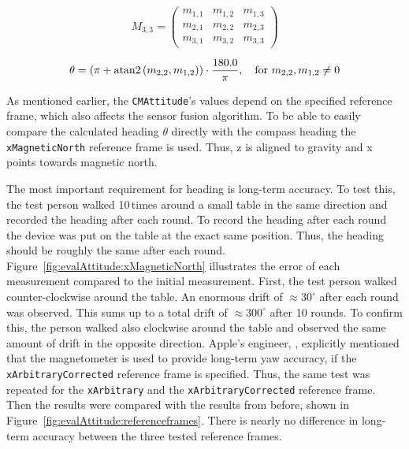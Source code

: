 \begin{equation} \label{eq:rotationmatrix}
  M_{3,3} = \begin{pmatrix}
      m_{1,1} & m_{1,2} & m_{1,3} \\
      m_{2,1} & m_{2,2} & m_{2,3} \\
      m_{3,1} & m_{3,2} & m_{3,3}
  \end{pmatrix}
\end{equation}

\begin{equation} \label{eq:rotation2heading}
  \theta = (\pi + {\rm atan2}\left(m_{2,2} , m_{1,2}\right)) \cdot \frac{180.0}{\pi}, \quad \text{for } m_{2,2}, m_{1,2} \neq 0
\end{equation}

\noindent As mentioned earlier, the \texttt{CMAttitude}'s values depend on the specified reference frame, which also affects the sensor fusion algorithm. To be able to easily compare the calculated heading $\theta$ directly with the compass heading the \texttt{xMagneticNorth} reference frame is used. Thus, z is aligned to gravity and x points towards magnetic north.

The most important requirement for heading is long-term accuracy. To test this, the test person walked 10\,times around a small table in the same direction and recorded the heading after each round. To record the heading after each round the device was put on the table at the exact same position. Thus, the heading should be roughly the same after each round. Figure~\ref{fig:evalAttitude:xMagneticNorth} illustrates the error of each measurement compared to the initial measurement. First, the test person walked counter-clockwise around the table. An enormous drift of $\approx 30^{\circ}$ after each round was observed. This sums up to a total drift of $\approx 300^{\circ}$ after 10 rounds. To confirm this, the person walked also clockwise around the table and observed the same amount of drift in the opposite direction. Apple's engineer, \citet{apple:wwdc_2012_pham}, explicitly mentioned that the magnetometer is used to provide long-term yaw accuracy, if the \texttt{xArbitraryCorrected} reference frame is specified. Thus, the same test was repeated for the \texttt{xArbitrary} and the \texttt{xArbitraryCorrected} reference frame. Then the results were compared with the results from before, shown in Figure~\ref{fig:evalAttitude:referenceframes}. There is nearly no difference in long-term accuracy between the three tested reference frames.


